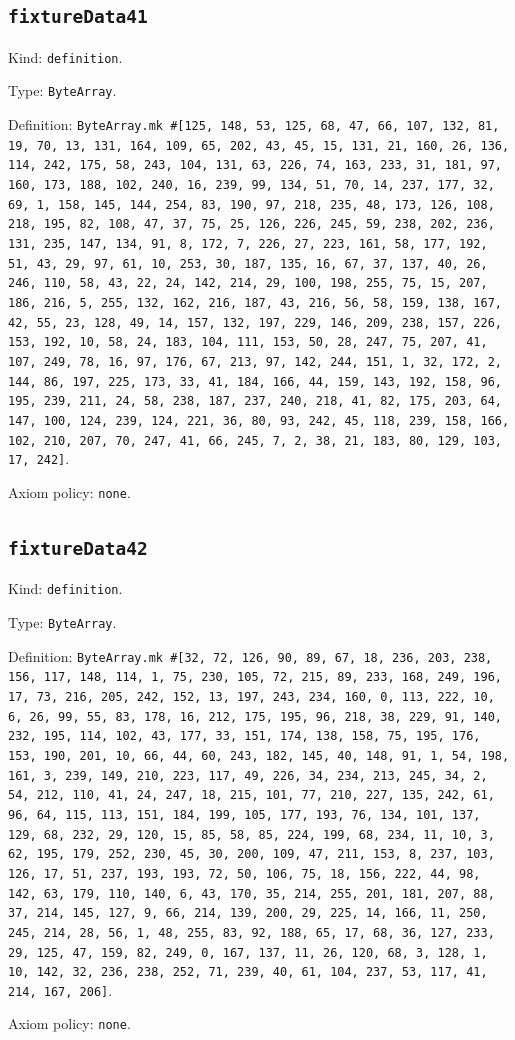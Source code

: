 \documentclass[11pt]{article}
\begin{document}
\subsection*{\texttt{fixtureData41}}
\noindent Kind: \texttt{definition}.\par
\noindent Type: \texttt{ByteArray}.\par
\noindent Definition: \texttt{ByteArray.mk \#[125, 148, 53, 125, 68, 47, 66, 107, 132, 81, 19, 70, 13, 131, 164, 109, 65, 202, 43, 45, 15, 131, 21, 160, 26, 136, 114, 242, 175, 58, 243, 104, 131, 63, 226, 74, 163, 233, 31, 181, 97, 160, 173, 188, 102, 240, 16, 239, 99, 134, 51, 70, 14, 237, 177, 32, 69, 1, 158, 145, 144, 254, 83, 190, 97, 218, 235, 48, 173, 126, 108, 218, 195, 82, 108, 47, 37, 75, 25, 126, 226, 245, 59, 238, 202, 236, 131, 235, 147, 134, 91, 8, 172, 7, 226, 27, 223, 161, 58, 177, 192, 51, 43, 29, 97, 61, 10, 253, 30, 187, 135, 16, 67, 37, 137, 40, 26, 246, 110, 58, 43, 22, 24, 142, 214, 29, 100, 198, 255, 75, 15, 207, 186, 216, 5, 255, 132, 162, 216, 187, 43, 216, 56, 58, 159, 138, 167, 42, 55, 23, 128, 49, 14, 157, 132, 197, 229, 146, 209, 238, 157, 226, 153, 192, 10, 58, 24, 183, 104, 111, 153, 50, 28, 247, 75, 207, 41, 107, 249, 78, 16, 97, 176, 67, 213, 97, 142, 244, 151, 1, 32, 172, 2, 144, 86, 197, 225, 173, 33, 41, 184, 166, 44, 159, 143, 192, 158, 96, 195, 239, 211, 24, 58, 238, 187, 237, 240, 218, 41, 82, 175, 203, 64, 147, 100, 124, 239, 124, 221, 36, 80, 93, 242, 45, 118, 239, 158, 166, 102, 210, 207, 70, 247, 41, 66, 245, 7, 2, 38, 21, 183, 80, 129, 103, 17, 242]}.\par
\noindent Axiom policy: \texttt{none}.\par
\subsection*{\texttt{fixtureData42}}
\noindent Kind: \texttt{definition}.\par
\noindent Type: \texttt{ByteArray}.\par
\noindent Definition: \texttt{ByteArray.mk \#[32, 72, 126, 90, 89, 67, 18, 236, 203, 238, 156, 117, 148, 114, 1, 75, 230, 105, 72, 215, 89, 233, 168, 249, 196, 17, 73, 216, 205, 242, 152, 13, 197, 243, 234, 160, 0, 113, 222, 10, 6, 26, 99, 55, 83, 178, 16, 212, 175, 195, 96, 218, 38, 229, 91, 140, 232, 195, 114, 102, 43, 177, 33, 151, 174, 138, 158, 75, 195, 176, 153, 190, 201, 10, 66, 44, 60, 243, 182, 145, 40, 148, 91, 1, 54, 198, 161, 3, 239, 149, 210, 223, 117, 49, 226, 34, 234, 213, 245, 34, 2, 54, 212, 110, 41, 24, 247, 18, 215, 101, 77, 210, 227, 135, 242, 61, 96, 64, 115, 113, 151, 184, 199, 105, 177, 193, 76, 134, 101, 137, 129, 68, 232, 29, 120, 15, 85, 58, 85, 224, 199, 68, 234, 11, 10, 3, 62, 195, 179, 252, 230, 45, 30, 200, 109, 47, 211, 153, 8, 237, 103, 126, 17, 51, 237, 193, 193, 72, 50, 106, 75, 18, 156, 222, 44, 98, 142, 63, 179, 110, 140, 6, 43, 170, 35, 214, 255, 201, 181, 207, 88, 37, 214, 145, 127, 9, 66, 214, 139, 200, 29, 225, 14, 166, 11, 250, 245, 214, 28, 56, 1, 48, 255, 83, 92, 188, 65, 17, 68, 36, 127, 233, 29, 125, 47, 159, 82, 249, 0, 167, 137, 11, 26, 120, 68, 3, 128, 1, 10, 142, 32, 236, 238, 252, 71, 239, 40, 61, 104, 237, 53, 117, 41, 214, 167, 206]}.\par
\noindent Axiom policy: \texttt{none}.\par
\end{document}
